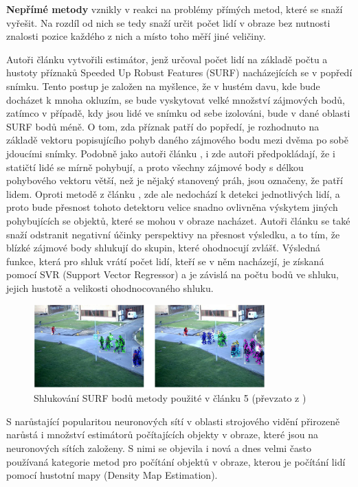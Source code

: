 \textbf{Nepřímé metody} vznikly v reakci na problémy přímých metod, které se snaží vyřešit.
Na rozdíl od nich se tedy snaží určit počet lidí v obraze bez nutnosti znalosti pozice každého z nich a místo toho měří jiné veličiny.

Autoři článku \cite{crowd_on_pets} vytvořili estimátor, jenž určoval počet lidí na základě počtu a hustoty příznaků Speeded Up Robust Features (SURF) \cite{SURF} nacházejících se v popředí snímku.
Tento postup je založen na myšlence, že v hustém davu, kde bude docházet k mnoha okluzím, se bude vyskytovat velké množství zájmových bodů, zatímco v případě, kdy jsou lidé ve snímku od sebe izolováni, bude v dané oblasti SURF bodů méně.
O tom, zda příznak patří do popředí, je rozhodnuto na základě vektoru popisujícího pohyb daného zájmového bodu mezi dvěma po sobě jdoucími snímky.
Podobně jako autoři článku \cite{head_and_shoulders}, i zde autoři předpokládají, že i statičtí lidé se mírně pohybují, a proto všechny zájmové body s délkou pohybového vektoru větší, než je nějaký stanovený práh, jsou označeny, že patří lidem.
Oproti metodě z článku \cite{head_and_shoulders}, zde ale nedochází k detekci jednotlivých lidí, a proto bude přesnost tohoto detektoru velice snadno ovlivněna výskytem jiných pohybujících se objektů, které se mohou v obraze nacházet.
Autoři článku se také snaží odstranit negativní účinky perspektivy na přesnost výsledku, a to tím, že blízké zájmové body shlukují do skupin, které ohodnocují zvlášť.
Výsledná funkce, která pro shluk vrátí počet lidí, kteří se v něm nacházejí, je získaná pomocí SVR (Support Vector Regressor) \cite{SVR} a je závislá na počtu bodů ve shluku, jejich hustotě a velikosti ohodnocovaného shluku.

\begin{figure}[h!]
	\centering
	\includegraphics[width=0.8\textwidth]{Figures/history/PETS_CLUSTERS.png}
	\caption{Shlukování SURF bodů metody použité v článku 5 \cite{crowd_on_pets} (převzato z \cite{crowd_on_pets})}
	\label{fig:PETS}
\end{figure}



S narůstající popularitou neuronových sítí v oblasti strojového vidění přirozeně narůstá i množství estimátorů počítajících objekty v obraze, které jsou na neuronových sítích založeny.
S nimi se objevila i nová a dnes velmi často používaná kategorie metod pro počítání objektů v obraze, kterou je počítání lidí pomocí hustotní mapy (Density Map Estimation).

